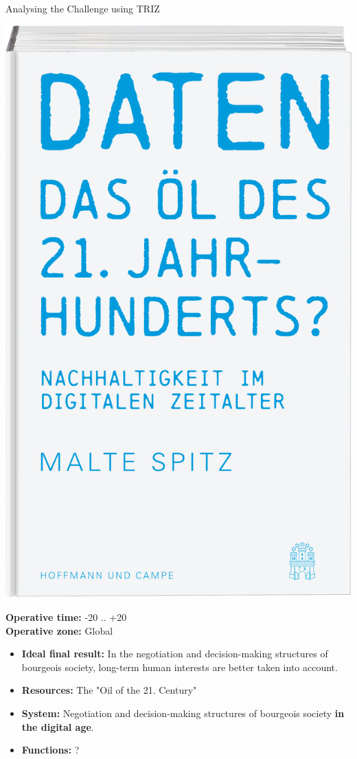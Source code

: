 \documentclass{beamer}
\begin{document}
\begin{frame}{Analysing the Challenge using TRIZ}
  \begin{minipage}{.4\textwidth}\centering  
    \includegraphics[width=.95\textwidth]{Bilder/uefIhP.jpg}
  \end{minipage}\hfill
  \begin{minipage}{.55\textwidth}
    \textbf{Operative time:} -20 .. +20\\
    \textbf{Operative zone:} Global\small
    \begin{itemize}
    \item \textbf{Ideal final result:} In the negotiation and decision-making
      structures of bourgeois society, long-term human interests are better
      taken into account.
      \item \textbf{Resources:} The "Oil of the 21. Century"
      \item \textbf{System:} Negotiation and decision-making structures of
        bourgeois society \textbf{in the digital age}.
      \item \textbf{Functions:} ?
    \end{itemize}
  \end{minipage}
\end{frame}
\end{document}
